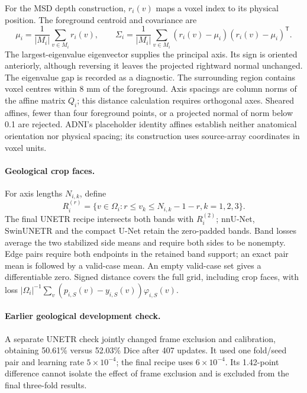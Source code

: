 \documentclass[12pt,a4paper]{article}
\begin{document}
For the MSD depth construction, $r_i(v)$ maps a voxel index to its
physical position. The foreground centroid and covariance are
\begin{equation}
\mu_i=\frac{1}{|M_i|}\sum_{v\in M_i}r_i(v),\qquad
\Sigma_i=\frac{1}{|M_i|}\sum_{v\in M_i}
(r_i(v)-\mu_i)(r_i(v)-\mu_i)^{\mathsf T}.
\label{eq:depth-centroid-covariance}
\end{equation}
The largest-eigenvalue eigenvector supplies the principal axis. Its
sign is oriented anteriorly, although reversing it leaves the projected
rightward normal unchanged. The eigenvalue gap is recorded as a
diagnostic. The surrounding region contains voxel centres within
8 mm of the foreground. Axis spacings are column norms of the affine
matrix $Q_i$; this distance calculation requires orthogonal axes.
Sheared affines, fewer than four foreground points, or a projected
normal of norm below 0.1 are rejected. ADNI's placeholder identity
affines establish neither anatomical orientation nor physical spacing;
its construction uses source-array coordinates in voxel units.

\paragraph{Geological crop faces.}\label{sec:geo-boundaries}
For axis lengths $N_{i,k}$, define
\begin{equation}
R_i^{(r)}=\{v\in\Omega_i:r\leq v_k\leq N_{i,k}-1-r, k=1,2,3\}.
\label{eq:geological-band-frame}
\end{equation}
The final UNETR recipe intersects both bands with $R_i^{(2)}$;
nnU-Net, SwinUNETR and the compact U-Net retain the zero-padded bands.
Band losses average the two stabilized side means and require both
sides to be nonempty. Edge pairs require both endpoints in the retained
band support; an exact pair mean is followed by a valid-case mean.
An empty valid-case set gives a differentiable zero. Signed distance
covers the full grid, including crop faces, with loss
$|\Omega_i|^{-1}\sum_v(p_{i,S}(v)-y_{i,S}(v))\varphi_{i,S}(v)$.

\paragraph{Earlier geological development check.}\label{sec:geo-development}
A separate UNETR check jointly changed frame exclusion and calibration,
obtaining 50.61\% versus 52.03\% Dice after 407
updates. It used one fold/seed pair and learning rate $5\times10^{-4}$;
the final recipe uses $6\times10^{-4}$. Its 1.42-point difference
cannot isolate the effect of frame exclusion and is excluded from the
final three-fold results.
\end{document}
